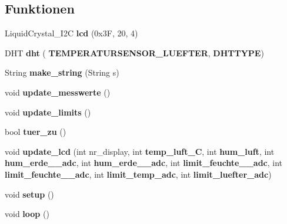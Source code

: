 \subsection*{Funktionen}
\begin{DoxyCompactItemize}
\item 
Liquid\+Crystal\+\_\+\+I2C \textbf{ lcd} (0x3\+F, 20, 4)
\item 
D\+HT \textbf{ dht} (\textbf{ T\+E\+M\+P\+E\+R\+A\+T\+U\+R\+S\+E\+N\+S\+O\+R\+\_\+\+L\+U\+E\+F\+T\+ER}, \textbf{ D\+H\+T\+T\+Y\+PE})
\item 
String \textbf{ make\+\_\+string} (String s)
\item 
void \textbf{ update\+\_\+messwerte} ()
\item 
void \textbf{ update\+\_\+limits} ()
\item 
bool \textbf{ tuer\+\_\+zu} ()
\item 
void \textbf{ update\+\_\+lcd} (int nr\+\_\+display, int \textbf{ temp\+\_\+luft\+\_\+C}, int \textbf{ hum\+\_\+luft}, int \textbf{ hum\+\_\+erde\+\_\+\_\+adc}, int \textbf{ hum\+\_\+erde\+\_\+\_\+adc}, int \textbf{ limit\+\_\+feuchte\+\_\+\_\+adc}, int \textbf{ limit\+\_\+feuchte\+\_\+\_\+adc}, int \textbf{ limit\+\_\+temp\+\_\+adc}, int \textbf{ limit\+\_\+luefter\+\_\+adc})
\item 
void \textbf{ setup} ()
\item 
void \textbf{ loop} ()
\end{DoxyCompactItemize}
